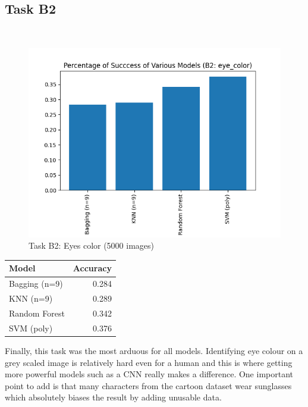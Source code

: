 \documentclass[a4paper,12pt,twoside,twocolumn]{article}
\begin{document}
\subsection{Task B2}
\label{sec:orgdf070f1}

\pagebreak\\


\begin{center}
\begin{figure}[htbp]
\centering
\includegraphics[width=.9\linewidth]{./images/B2: eye_color.png}
\caption{Task B2: Eyes color (5000 images)}
\end{figure}
\end{center}

\begin{center}
\begin{tabular}{lr}
Model & Accuracy\\
\hline
Bagging (n=9) & 0.284\\
KNN (n=9) & 0.289\\
Random Forest & 0.342\\
SVM (poly) & 0.376\\
\end{tabular}
\end{center}

Finally, this task was the most arduous for all models. Identifying eye colour on a grey scaled image is relatively hard even for a human and this is where getting more powerful models such as a CNN really makes a difference. One important point to add is that many characters from the cartoon dataset wear sunglasses which absolutely biases the result by adding unusable data.\\
\end{document}

